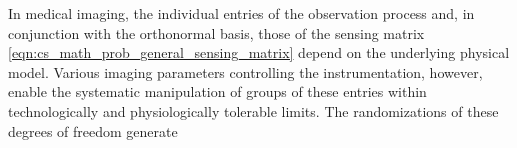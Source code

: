 In
medical imaging,
the individual entries of
the observation process and, in conjunction with
the orthonormal basis,
those of
the sensing matrix
\eqref{eqn:cs_math_prob_general_sensing_matrix} depend on
the underlying physical model.
Various imaging parameters controlling
the instrumentation, however, enable
the systematic manipulation of
groups of
these entries within
technologically and
physiologically tolerable limits.
The randomizations of
these degrees of
freedom generate
